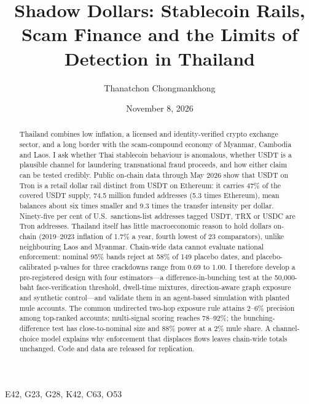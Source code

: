 \documentclass{article}
\title{Shadow Dollars: Stablecoin Rails, Scam Finance and the Limits of Detection in Thailand}
\author{Thanatchon Chongmankhong}
\date{November 8, 2026}
\theoremstyle{plain}
\theoremstyle{definition}
\theoremstyle{remark}
\newcommand{\1}{\mathbf{1}}
\begin{document}
\maketitle

\begin{abstract}
Thailand combines low inflation, a licensed and identity-verified crypto exchange sector, and a long border with the
scam-compound economy of Myanmar, Cambodia and Laos. I ask whether Thai stablecoin behaviour is anomalous, whether
USDT is a plausible channel for laundering transnational fraud proceeds, and how either claim can be tested credibly.
Public on-chain data through May 2026 show that USDT on Tron is a retail dollar rail distinct from USDT on Ethereum: it
carries 47\% of the covered USDT supply, 74.5 million funded addresses (5.3 times Ethereum), mean balances about six
times smaller and 9.3 times the transfer intensity per dollar. Ninety-five per cent of U.S.\ sanctions-list addresses
tagged USDT, TRX or USDC are Tron addresses. Thailand itself has little macroeconomic reason to hold dollars on-chain
(2019--2023 inflation of 1.7\% a year, fourth lowest of 23 comparators), unlike neighbouring Laos and Myanmar.
Chain-wide data cannot evaluate national enforcement: nominal 95\% bands reject at 58\% of 149 placebo dates, and
placebo-calibrated p-values for three crackdowns range from 0.69 to 1.00. I therefore develop a pre-registered design
with four estimators---a difference-in-bunching test at the 50,000-baht face-verification threshold, dwell-time
mixtures, direction-aware graph exposure and synthetic control---and validate them in an agent-based simulation with
planted mule accounts. The common undirected two-hop exposure rule attains 2--6\% precision among top-ranked accounts;
multi-signal scoring reaches 78--92\%; the bunching-difference test has close-to-nominal size and 88\% power at a 2\%
mule share. A channel-choice model explains why enforcement that displaces flows leaves chain-wide totals unchanged.
Code and data are released for replication.
\end{abstract}


\smallskip
{}\enspace E42, G23, G28, K42, C63, O53
\end{document}
